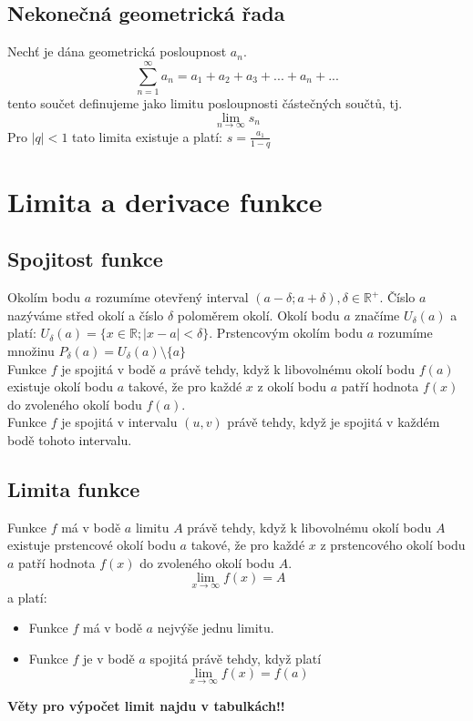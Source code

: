 \documentclass[12pt, a4paper]{article}
\begin{document}
\subsection*{Nekonečná geometrická řada}
Nechť je dána geometrická posloupnost $a_n$. \[ \sum_{n=1}^{\infty} a_n = a_1+a_2+a_3+...+a_n+... \] tento součet definujeme
jako limitu posloupnosti částečných součtů, tj. \[ \lim_{n\to\infty} s_n \]
Pro $|q|<1$ tato limita existuje a platí: $s = \frac{a_1}{1-q}$

\section{Limita a derivace funkce}
\subsection*{Spojitost funkce}
Okolím bodu $a$ rozumíme otevřený interval $(a-\delta; a+\delta), \delta \in \mathbb{R}^+$. Číslo $a$ nazýváme střed okolí a číslo 
$\delta$ poloměrem okolí. Okolí bodu $a$ značíme $U_\delta (a)$ a platí: $U_\delta (a)=\{x \in \mathbb{R}; |x-a|<\delta\}$. Prstencovým 
okolím bodu $a$ rozumíme množinu $P_\delta (a) = U_\delta (a) \setminus \{a\}$\\

Funkce $f$ je spojitá v bodě $a$ právě tehdy, když k libovolnému okolí bodu $f(a)$ existuje okolí bodu $a$ takové, že pro každé 
$x$ z okolí bodu $a$ patří hodnota $f(x)$ do zvoleného okolí bodu $f(a)$.\\
Funkce $f$ je spojitá v intervalu $(u, v)$ právě tehdy, když je spojitá v každém bodě tohoto intervalu.

\subsection*{Limita funkce}
Funkce $f$ má v bodě $a$ limitu $A$ právě tehdy, když k libovolnému okolí bodu $A$ existuje prstencové okolí bodu $a$ takové,
že pro každé $x$ z prstencového okolí bodu $a$ patří hodnota $f(x)$ do zvoleného okolí bodu $A$.\\

\[ \lim_{x \to \infty} f(x) = A\] a platí:\\
\begin{itemize}
	\item Funkce $f$ má v bodě $a$ nejvýše jednu limitu.
	\item Funkce $f$ je v bodě $a$ spojitá právě tehdy, když platí \[ \lim_{x \to \infty} f(x) = f(a) \]
\end{itemize} 
\textbf{Věty pro výpočet limit najdu v tabulkách!!}
\end{document}

